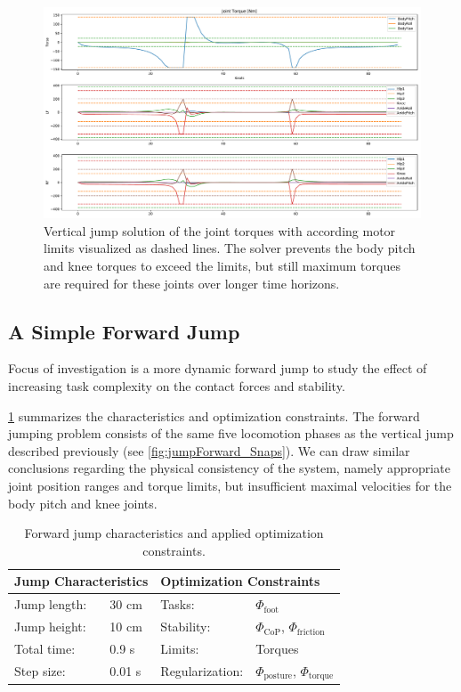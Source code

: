 \begin{figure}
\centering	
\includegraphics[width=1\textwidth]{fig/jumpVertical/JointTorques}
\caption[Vertical jump solution with according torque limits]{Vertical jump solution of the joint torques with according motor limits visualized as dashed lines. The solver prevents the body pitch and knee torques to exceed the limits, but still maximum torques are required for these joints over longer time horizons.}
\label{fig:jumpVertical_JointTorques}
\end{figure} 

\subsection{A Simple Forward Jump}
Focus of investigation is a more dynamic forward jump to study the effect of increasing task complexity on the contact forces and stability.

\cref{tab:jumpForward} summarizes the characteristics and optimization constraints. The forward jumping problem consists of the same five locomotion phases as the vertical jump described previously (see \cref{fig:jumpForward_Snaps}). 
We can draw similar conclusions regarding the physical consistency of the system, namely appropriate joint position ranges and torque limits, but insufficient maximal velocities for the body pitch and knee joints. 

\begin{table}[t]
\centering
\caption[Forward jump characteristics and optimization constraints]{Forward jump characteristics and applied optimization constraints.}
\begin{tabular}{|ll|ll|}
\hline
\multicolumn{2}{|l|}{\textbf{Jump Characteristics}} & \multicolumn{2}{l|}{\textbf{Optimization Constraints}} \\ \hline
Jump length:& 30 cm 	& Tasks: 			& $\Phi_{\text{foot}}$ \\ \hline
Jump height:& 10 cm	& Stability:    		& $\Phi_{\text{CoP}}$, $\Phi_{\text{friction}}$\\ \hline
Total time:& 0.9 s 	& Limits: 			& Torques\\ \hline
Step size:& 0.01 s 	& Regularization: 	& $\Phi_{\text{posture}}$, $\Phi_{\text{torque}}$\\ \hline
\end{tabular}
\label{tab:jumpForward}
\end{table}

